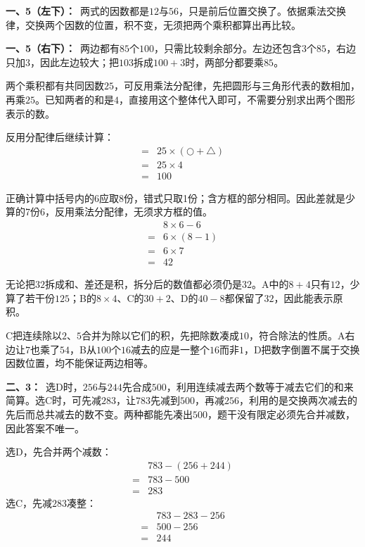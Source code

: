\documentclass[multi=snippet,border=0pt]{standalone}
\newenvironment{snippet}[3]{\begin{minipage}{#1bp}\color{answerred}\fontsize{#2}{#3}\selectfont\raggedright}{\end{minipage}}
\begin{document}
\begin{snippet}{505}{11.5}{14}\textbf{一、5（左下）：}\ 两式的因数都是\(12\)与\(56\)，只是前后位置交换了。依据乘法交换律，交换两个因数的位置，积不变，无须把两个乘积都算出再比较。\end{snippet}
\begin{snippet}{505}{11.5}{14}\textbf{一、5（右下）：}\ 两边都有\(85\)个\(100\)，只需比较剩余部分。左边还包含\(3\)个\(85\)，右边只加\(3\)，因此左边较大；把\(103\)拆成\(100+3\)时，两部分都要乘\(85\)。\end{snippet}
\begin{snippet}{505}{11.5}{14}两个乘积都有共同因数\(25\)，可反用乘法分配律，先把圆形与三角形代表的数相加，再乘\(25\)。已知两者的和是\(4\)，直接用这个整体代入即可，不需要分别求出两个图形表示的数。\par 反用分配律后继续计算：\[\begin{aligned}={}&25\times(\bigcirc+\triangle)\\={}&25\times4\\={}&100\end{aligned}\]\end{snippet}
\begin{snippet}{505}{11.5}{14}正确计算中括号内的6应取8份，错式只取1份；含方框的部分相同。因此差就是少算的7份6，反用乘法分配律，无须求方框的值。\[\begin{aligned}&8\times6-6\\={}&6\times(8-1)\\={}&6\times7\\={}&42\end{aligned}\]\end{snippet}
\begin{snippet}{505}{11.5}{14}无论把\(32\)拆成和、差还是积，拆分后的数值都必须仍是\(32\)。A中的\(8+4\)只有\(12\)，少算了若干份\(125\)；B的\(8\times4\)、C的\(30+2\)、D的\(40-8\)都保留了\(32\)，因此能表示原积。\end{snippet}
\begin{snippet}{505}{11.5}{14}C把连续除以\(2\)、\(5\)合并为除以它们的积，先把除数凑成\(10\)，符合除法的性质。A右边让\(7\)也乘了\(54\)，B从\(100\)个\(16\)减去的应是一整个\(16\)而非\(1\)，D把数字倒置不属于交换因数位置，均不能保证两边相等。\end{snippet}
\begin{snippet}{505}{11.5}{14}\textbf{二、3：}\ 选D时，\(256\)与\(244\)先合成\(500\)，利用连续减去两个数等于减去它们的和来简算。选C时，可先减\(283\)，让\(783\)先减到\(500\)，再减\(256\)，利用的是交换两次减去的先后而总共减去的数不变。两种都能先凑出\(500\)，题干没有限定必须先合并减数，因此答案不唯一。\par 选D，先合并两个减数：\[\begin{aligned}&783-(256+244)\\={}&783-500\\={}&283\end{aligned}\]选C，先减\(283\)凑整：\[\begin{aligned}&783-283-256\\={}&500-256\\={}&244\end{aligned}\]\end{snippet}
\end{document}
